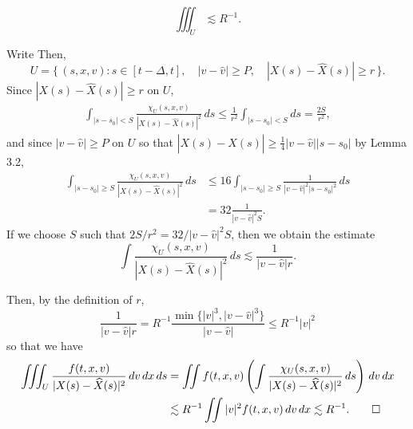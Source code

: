 \documentclass[12pt]{article}
\begin{document}
\begin{prop}
\[\iiint_U\lesssim R^{-1}.\]
\end{prop}
\begin{pf}
Write
Then,
\[U=\{\,(s,x,v):s\in[t-\Delta,t],\quad|v-\hat v|\ge P,\quad |X(s)-\hat X(s)|\ge r\,\}.\]
Since $|X(s)-\hat X(s)|\ge r$ on $U$,
\begin{align*}
\int_{|s-s_0|<S}\frac{\chi_U(s,x,v)}{|X(s)-\hat X(s)|^2}\,ds
\le\frac1{r^2}\int_{|s-s_0|<S}ds=\frac{2S}{r^2},
\end{align*}
and since $|v-\hat v|\ge P$ on $U$ so that $|X(s)-\hat X(s)|\ge\frac14|v-\hat v||s-s_0|$ by Lemma 3.2,
\begin{align*}
\int_{|s-s_0|\ge S}\frac{\chi_U(s,x,v)}{|X(s)-\hat X(s)|^2}\,ds
&\le16\int_{|s-s_0|\ge S}\frac1{|v-\hat v|^2|s-s_0|^2}\,ds\\
&=32\frac1{|v-\hat v|^2S}.
\end{align*}
If we choose $S$ such that $2S/r^2=32/|v-\hat v|^2S$, then we obtain the estimate
\[\int\frac{\chi_U(s,x,v)}{|X(s)-\hat X(s)|^2}\,ds\lesssim\frac1{|v-\hat v|r}.\]

Then, by the definition of $r$, 
\[\frac1{|v-\hat v|r}=R^{-1}\frac{\min\{|v|^3,|v-\hat v|^3\}}{|v-\hat v|}\le R^{-1}|v|^2\]
so that we have
\begin{align*}
\iiint_U\frac{f(t,x,v)}{|X(s)-\hat X(s)|^2}\,dv\,dx\,ds
&=\iint f(t,x,v)\left(\int\frac{\chi_U(s,x,v)}{|X(s)-\hat X(s)|^2}\,ds\right)\,dv\,dx\\
&\lesssim R^{-1}\iint|v|^2f(t,x,v)\,dv\,dx\lesssim R^{-1}.\qedhere
\end{align*}
\end{pf}
\end{document}
